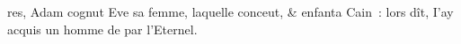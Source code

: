 \documentclass[paper=a7,pagesize=pdftex]{scrbook}
\begin{document}
\parbox{6cm}{
res, Adam cognut Eve sa fem\-me, laquelle conceut, \& enfan\-ta
 Cain~: lors dît, I'ay acquis un homme de par l'Eternel.
}
\end{document}

